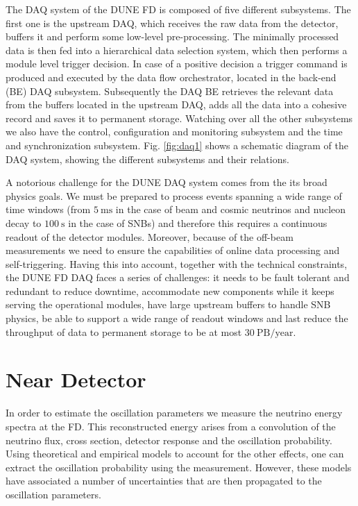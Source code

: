 The DAQ system of the DUNE FD is composed of five different subsystems. The first one is the upstream DAQ, which receives the raw data from the detector, buffers it and perform some low-level pre-processing. The minimally processed data is then fed into a hierarchical data selection system, which then performs a module level trigger decision. In case of a positive decision a trigger command is produced and executed by the data flow orchestrator, located in the back-end (BE) DAQ subsystem. Subsequently the DAQ BE retrieves the relevant data from the buffers located in the upstream DAQ, adds all the data into a cohesive record and saves it to permanent storage. Watching over all the other subsystems we also have the control, configuration and monitoring subsystem and the time and synchronization subsystem. Fig. \ref{fig:daq1} shows a schematic diagram of the DAQ system, showing the different subsystems and their relations.

A notorious challenge for the DUNE DAQ system comes from the its broad physics goals. We must be prepared to process events spanning a wide range of time windows (from $5 \ \mathrm{ms}$ in the case of beam and cosmic neutrinos and nucleon decay to $100 \ \mathrm{s}$ in the case of SNBs) and therefore this requires a continuous readout of the detector modules. Moreover, because of the off-beam measurements we need to ensure the capabilities of online data processing and self-triggering. Having this into account, together with the technical constraints, the DUNE FD DAQ faces a series of challenges: it needs to be fault tolerant and redundant to reduce downtime, accommodate new components while it keeps serving the operational modules, have large upstream buffers to handle SNB physics, be able to support a wide range of readout windows and last reduce the throughput of data to permanent storage to be at most $30 \ \mathrm{PB/year}$.

\section{Near Detector}

In order to estimate the oscillation parameters we measure the neutrino energy spectra at the FD. This reconstructed energy arises from a convolution of the neutrino flux, cross section, detector response and the oscillation probability. Using theoretical and empirical models to account for the other effects, one can extract the oscillation probability using the measurement. However, these models have associated a number of uncertainties that are then propagated to the oscillation parameters.


